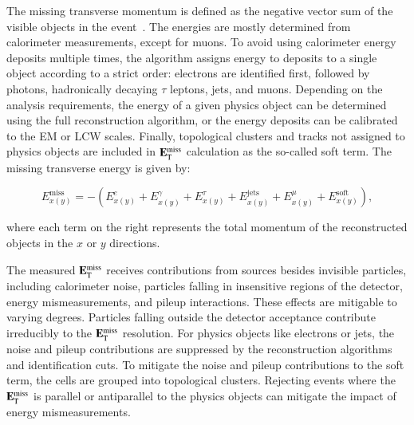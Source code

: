 The missing transverse momentum is defined as the negative vector sum of the visible objects in the event~\cite{TheATLASCollaboration:2012jy,TheATLASCollaboration:2013ua}. The energies are mostly determined from calorimeter measurements, except for muons. To avoid using calorimeter energy deposits multiple times, the algorithm assigns energy to deposits to a single object according to a strict order: electrons are identified first, followed by photons, hadronically decaying $\tau$ leptons, jets, and muons. Depending on the analysis requirements, the energy of a given physics object can be determined using the full reconstruction algorithm, or the energy deposits can be calibrated to the EM or LCW scales. Finally, topological clusters and tracks not assigned to physics objects are included in $\mathbf{E}_{\mathrm{T}}^{\mathrm{miss}}$ calculation as the so-called soft term. The missing transverse energy is given by:

\begin{equation}\label{eqn:reco-met}
	E_{x(y)}^{\mathrm{miss}} = -\left(E_{x(y)}^{e} + E_{x(y)}^{\gamma} + E_{x(y)}^{\tau} + E_{x(y)}^{\mathrm{jets}} + E_{x(y)}^{\mu} + E_{x(y)}^{\mathrm{soft}}\right),
\end{equation}

where each term on the right represents the total momentum of the reconstructed objects in the $x$ or $y$ directions.

The measured $\mathbf{E}_{\mathrm{T}}^{\mathrm{miss}}$ receives contributions from sources besides invisible particles, including calorimeter noise, particles falling in insensitive regions of the detector, energy mismeasurements, and pileup interactions. These effects are mitigable to varying degrees. Particles falling outside the detector acceptance contribute irreducibly to the $\mathbf{E}_{\mathrm{T}}^{\mathrm{miss}}$ resolution. For physics objects like electrons or jets, the noise and pileup contributions are suppressed by the reconstruction algorithms and identification cuts. To mitigate the noise and pileup contributions to the soft term, the cells are grouped into topological clusters. Rejecting events where the $\mathbf{E}_{\mathrm{T}}^{\mathrm{miss}}$ is parallel or antiparallel to the physics objects can mitigate the impact of energy mismeasurements. 


